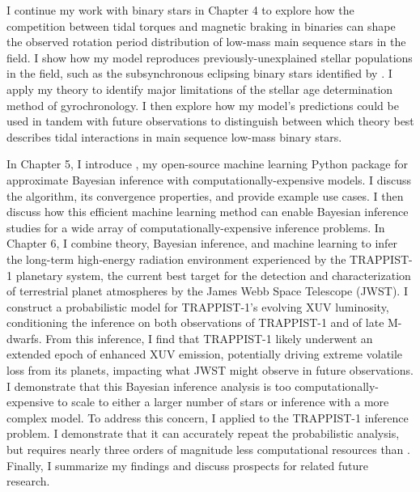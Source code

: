 I continue my work with binary stars in Chapter 4 to explore how the competition between tidal torques and magnetic braking in binaries can shape the observed rotation period distribution of low-mass main sequence stars in the \kepler field. I show how my model reproduces previously-unexplained stellar populations in the \kepler field, such as the subsynchronous eclipsing binary stars identified by \citet{Lurie2017}. I apply my theory to identify major limitations of the stellar age determination method of gyrochronology. I then explore how my model's predictions could be used in tandem with future observations to distinguish between which theory best describes tidal interactions in main sequence low-mass binary stars.

In Chapter 5, I introduce \approxposterior, my open-source machine learning Python package for approximate Bayesian inference with computationally-expensive models. I discuss the algorithm, its convergence properties, and provide example use cases. I then discuss how this efficient machine learning method can enable Bayesian inference studies for a wide array of computationally-expensive inference problems. In Chapter 6, I combine theory, Bayesian inference, and machine learning to infer the long-term high-energy radiation environment experienced by the TRAPPIST-1 planetary system, the current best target for the detection and characterization of terrestrial planet atmospheres by the James Webb Space Telescope (JWST). I construct a probabilistic model for TRAPPIST-1's evolving XUV luminosity, conditioning the inference on both observations of TRAPPIST-1 and of late M-dwarfs. From this inference, I find that TRAPPIST-1 likely underwent an extended epoch of enhanced XUV emission, potentially driving extreme volatile loss from its planets, impacting what JWST might observe in future observations. I demonstrate that this Bayesian inference analysis is too computationally-expensive to scale to either a larger number of stars or inference with a more complex model. To address this concern, I applied \approxposterior to the TRAPPIST-1 inference problem. I demonstrate that it can accurately repeat the probabilistic analysis, but requires nearly three orders of magnitude less computational resources than \emcee.  Finally, I summarize my findings and discuss prospects for related future research.

